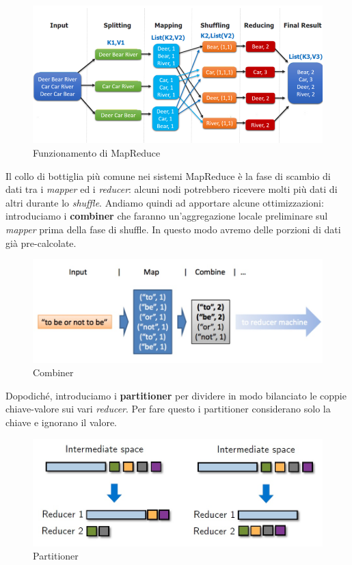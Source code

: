 \documentclass{article}
\begin{document}
\begin{appendices}
\begin{figure}[H]
    \centering
    \includegraphics[scale=0.6]{img/mapreduce.png}
    \caption{Funzionamento di MapReduce}
\end{figure}\noindent
Il collo di bottiglia più comune nei sistemi MapReduce è la fase di scambio di dati tra i \textit{mapper} ed i \textit{reducer}: alcuni nodi potrebbero ricevere molti più dati di altri durante lo \textit{shuffle}. Andiamo quindi ad apportare alcune ottimizzazioni: introduciamo i \textbf{combiner} che faranno un'aggregazione locale preliminare sul \textit{mapper} prima della fase di shuffle. In questo modo avremo delle porzioni di dati già pre-calcolate.
\begin{figure}[H]
    \centering
    \includegraphics[scale=0.4]{img/combiner.jpg}
    \caption{Combiner}
\end{figure}\noindent
Dopodiché, introduciamo i \textbf{partitioner} per dividere in modo bilanciato le coppie chiave-valore sui vari \textit{reducer}. Per fare questo i partitioner considerano solo la chiave e ignorano il valore.
\begin{figure}[H]
    \centering
    \includegraphics[scale=0.4]{img/partitioner.jpg}
    \caption{Partitioner}
\end{figure}\noindent


\end{appendices}
\end{document}
